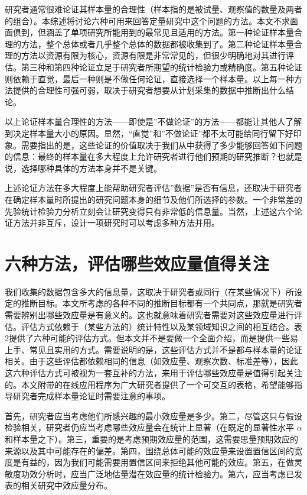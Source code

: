 \documentclass[
  letterpaper,
  DIV=11,
  numbers=noendperiod]{scrreprt}
\begin{document}
研究者通常很难论证其样本量的合理性（样本指的是被试量、观察值的数量及两者的组合）。本综述将讨论六种可用来回答定量研究中这个问题的方法。本文不求面面俱到，但涵盖了单项研究所能用到的最常见且适用的方法。第一种论证样本量合理的方法，整个总体或者几乎整个总体的数据都被收集到了。第二种论证样本量合理的方法以资源有限为核心，资源有限是非常常见的，但很少明确地对其进行评估。第三种和第四种论证立足于研究者所期望的统计检验力或精确度。第五种论证则依赖于直觉，最后一种则是不做任何论证，直接选择一个样本量。以上每一种方法提供的合理性可强可弱，取决于研究者想要从计划采集的数据中推断出什么结论。

以上论证样本量合理性的方法------即使是''不做论证''的方法------都能让其他人了解到决定样本量大小的原因。显然，``直觉''和''不做论证''都不太可能给同行留下好印象。需要指出的是，这些论证的价值取决于我们从中获得了多少能够回答如下问题的信息：最终的样本量在多大程度上允许研究者进行他们预期的研究推断？也就是说，选择哪种具体的方法本身并不是关键。

上述论证方法在多大程度上能帮助研究者评估''数据''是否有信息，还取决于研究者在确定样本量时所提出的研究问题本身的细节及他们所选择的参数。一个非常差的先验统计检验力分析立刻会让研究变得只有非常低的信息量。当然，上述这六个论证方法并非互斥，设计一项研究时可以考虑多种方法并用。

\hypertarget{ux516dux79cdux65b9ux6cd5ux8bc4ux4f30ux54eaux4e9bux6548ux5e94ux91cfux503cux5f97ux5173ux6ce8}{%
\section{六种方法，评估哪些效应量值得关注}\label{ux516dux79cdux65b9ux6cd5ux8bc4ux4f30ux54eaux4e9bux6548ux5e94ux91cfux503cux5f97ux5173ux6ce8}}

我们收集的数据包含多大的信息量，这取决于研究者或同行（在某些情况下）所设定的推断目标。本文所考虑的各种不同的推断目标都有一个共同点，那就是研究者需要辨别出哪些效应量是有意义的。这也就意味着研究者需要对这些效应量进行评估。评估方式依赖于（某些方法的）统计特性以及某领域知识之间的相互结合。表2提供了六种可能的评估方式。但本文并不是要做一个全面介绍，而是提供一些易上手、常见且实用的方式。需要说明的是，这些评估方式并不是都与样本量的论证相关。由于这些评估都依赖相同的信息（如效应量、观察次数、标准差等），因此这六种评估方式可被视为一套互补的方法，来用于评估哪些效应量是值得引起关注的。本文附带的在线应用程序为广大研究者提供了一个可交互的表格，希望能够指导研究者完成样本量论证时需要注意的事项。

首先，研究者应当考虑他们所感兴趣的最小效应量是多少。第二，尽管这只与假设检验相关，研究者仍应当考虑哪些效应量会在统计上显著（在既定的显著性水平
\(\alpha\)
和样本量之下）。第三，重要的是考虑预期效应量的范围，这需要思量预期效应的来源以及其中可能存在的偏差。第四，围绕总体可能的效应量来设置置信区间的宽度是有益的，因为我们可能需要用置信区间来拒绝其他可能的效应。第五，在做灵敏度功效分析时，应当广泛地估量潜在效应量的统计检验力。第六，应当考虑已发表的相关研究中效应量分布。
\end{document}
